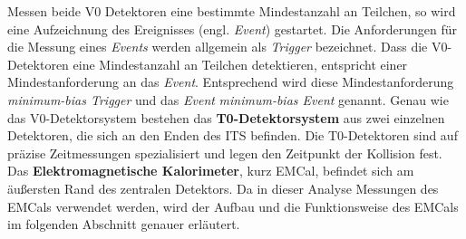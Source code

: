 Messen beide V0 Detektoren eine bestimmte Mindestanzahl an Teilchen, so wird eine Aufzeichnung des Ereignisses (engl. \textit{Event}) gestartet.
Die Anforderungen für die Messung eines \textit{Events} werden allgemein als \textit{Trigger} bezeichnet.
Dass die V0-Detektoren eine Mindestanzahl an Teilchen detektieren, entspricht einer Mindestanforderung an das \textit{Event}.
Entsprechend wird diese Mindestanforderung \textit{minimum-bias Trigger} und das \textit{Event} \textit{minimum-bias Event} genannt.
\newline
Genau wie das V0-Detektorsystem bestehen das \textbf{T0-Detektorsystem} aus zwei einzelnen Detektoren, die sich an den Enden des ITS befinden.
Die T0-Detektoren sind auf präzise Zeitmessungen spezialisiert und legen den Zeitpunkt der Kollision fest.
\newline
Das \textbf{Elektromagnetische Kalorimeter}, kurz EMCal, befindet sich am äußersten Rand des zentralen Detektors.
Da in dieser Analyse Messungen des EMCals verwendet werden, wird der Aufbau und die Funktionsweise des EMCals im folgenden Abschnitt genauer erläutert.